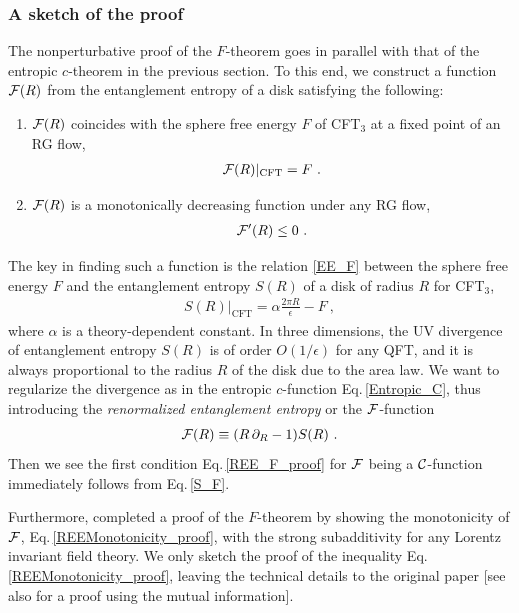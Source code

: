 \subsubsection{A sketch of the proof}
The nonperturbative proof of the $F$-theorem goes in parallel with that of the entropic $c$-theorem in the previous section.
To this end, we construct a function ${\cal F}(R)$ from the entanglement entropy of a disk satisfying the following:
\begin{enumerate}
\item ${\cal F}(R)$ coincides with the sphere free energy $F$ of CFT$_3$ at a fixed point of an RG flow,
	\begin{align}\label{REE_F_proof}
		{\cal F}(R) |_\text{CFT} = F \ .
	\end{align}
\item ${\cal F}(R)$ is a monotonically decreasing function under any RG flow,
	\begin{align}\label{REEMonotonicity_proof}
		{\cal F}'(R)\le 0 \ .
	\end{align}
\end{enumerate}
The key in finding such a function is the relation \eqref{EE_F} between the sphere free energy $F$ and the entanglement entropy $S(R)$ of a disk of radius $R$ for CFT$_3$,
\begin{align}\label{S_F}
S(R)|_\text{CFT} = \alpha \frac{2\pi R}{\epsilon} - F \ ,
\end{align}
where $\alpha$ is a theory-dependent constant.
In three dimensions, the UV divergence of entanglement entropy $S(R)$ is of order $O(1/\epsilon)$ for any QFT, and it is always proportional to the radius $R$ of the disk due to the area law.
We want to regularize the divergence as in the entropic $c$-function Eq.\,\eqref{Entropic_C}, thus
introducing the \emph{renormalized entanglement entropy} or the ${\cal F}$-function  \cite{Liu:2012eea}
\begin{align}\label{REE}
{\cal F} (R) \equiv (R\, \partial_R - 1) S(R) \ .
\end{align}
Then we see the first condition Eq.\,\eqref{REE_F_proof} for ${\cal F}$ being a ${\cal C}$-function immediately follows from Eq.\,\eqref{S_F}.


Furthermore, \textcite{Casini:2012ei} completed a proof of the $F$-theorem by showing the monotonicity of ${\cal F}$, Eq.\,\eqref{REEMonotonicity_proof}, with the strong subadditivity for any Lorentz invariant field theory.
We only sketch the proof of the inequality Eq.\,\eqref{REEMonotonicity_proof}, leaving the technical details to the original paper \cite{Casini:2012ei} [see also \textcite{Casini:2015woa} for a proof using the mutual information].

